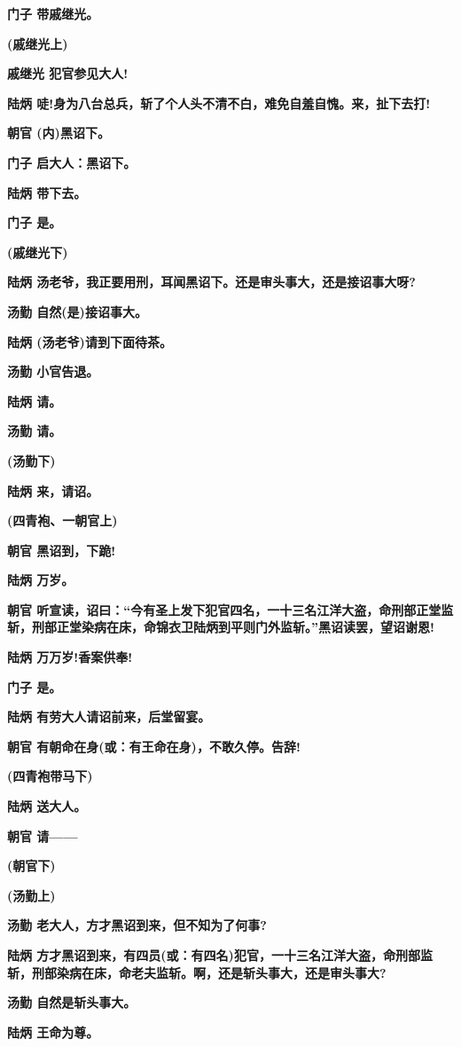 \textbf{门子 带戚继光。}

\textbf{(戚继光上)}

\textbf{戚继光 犯官参见大人!}

\textbf{陆炳
唗!身为八台总兵，斩了个人头不清不白，难免自羞自愧。来，扯下去打!}

\textbf{朝官 (内)黑诏下。}

\textbf{门子 启大人：黑诏下。}

\textbf{陆炳 带下去。}

\textbf{门子 是。}

\textbf{(戚继光下)}

\textbf{陆炳
汤老爷，我正要用刑，耳闻黑诏下。还是审头事大，还是接诏事大呀?}

\textbf{汤勤 自然(是)接诏事大。}

\textbf{陆炳 (汤老爷)请到下面待茶。}

\textbf{汤勤 小官告退。}

\textbf{陆炳 请。}

\textbf{汤勤 请。}

\textbf{(汤勤下)}

\textbf{陆炳 来，请诏。}

\textbf{(四青袍、一朝官上)}

\textbf{朝官 黑诏到，下跪!}

\textbf{陆炳 万岁。}

\textbf{朝官
听宣读，诏曰：``今有圣上发下犯官四名，一十三名江洋大盗，命刑部正堂监斩，刑部正堂染病在床，命锦衣卫陆炳到平则门外监斩。''黑诏读罢，望诏谢恩!}

\textbf{陆炳 万万岁!香案供奉!}

\textbf{门子 是。}

\textbf{陆炳 有劳大人请诏前来，后堂留宴。}

\textbf{朝官 有朝命在身(或：有王命在身)，不敢久停。告辞!}

\textbf{(四青袍带马下)}

\textbf{陆炳 送大人。}

\textbf{朝官 请------}

\textbf{(朝官下)}

\textbf{(汤勤上)}

\textbf{汤勤 老大人，方才黑诏到来，但不知为了何事?}

\textbf{陆炳
方才黑诏到来，有四员(或：有四名)犯官，一十三名江洋大盗，命刑部监斩，刑部染病在床，命老夫监斩。啊，还是斩头事大，还是审头事大?}

\textbf{汤勤 自然是斩头事大。}

\textbf{陆炳 王命为尊。}


